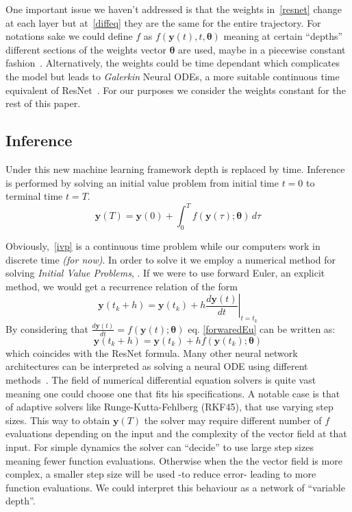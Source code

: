 \documentclass{article}
\begin{document}
    One important issue we haven't addressed is that the weights in~\eqref{resnet} change at each layer but at~\eqref{diffeq} they are the same for the entire trajectory.
    For notations sake we could define $f$ as $f(\pmb{y}(t), t, \pmb{\theta})$ meaning at certain ``depths'' different sections of the weights vector $\pmb{\theta}$ are used, maybe in a piecewise constant fashion~\cite{kidger2022neural}.
    Alternatively, the weights could be time dependant which complicates the model but leads to \textit{Galerkin} Neural ODEs, a more suitable continuous time equivalent of ResNet~\cite{massaroli2020dissecting}.
    For our purposes we consider the weights constant for the rest of this paper.

    \subsection{Inference}
    Under this new machine learning framework depth is replaced by time.
    Inference is performed by solving an initial value problem from initial time $t=0$ to terminal time $t=T$.
    \begin{equation}
        \pmb{y}(T) = \pmb{y}(0) + \int_{0}^{T} f(\pmb{y}(\tau); \pmb{\theta}) \, d\tau \label{ivp}
    \end{equation}

    Obviously,~\eqref{ivp} is a continuous time problem while our computers work in discrete time \textit{(for now)}.
    In order to solve it we employ a numerical method for solving \textit{Initial Value Problems}, .
    If we were to use forward Euler, an explicit method, we would get a recurrence relation of the form
    \begin{equation}
        \pmb{y}(t_k + h) = \pmb{y}(t_k) + h \left. \frac{d\pmb{y}(t)}{dt} \right|_{t = t_k}
        \label{forwaredEu}
    \end{equation}
    By considering that $\frac{d \pmb{y}(t)}{dt} = f(\pmb{y}(t);\pmb{\theta})$ eq. \eqref{forwaredEu} can be written as:
    \begin{equation}
        \pmb{y}(t_k + h) = \pmb{y}(t_k) + h f(\pmb{y}(t_k); \pmb{\theta} )
        \label{res2eul}
    \end{equation}
    which coincides with the ResNet formula.
    Many other neural network architectures can be interpreted as solving a neural ODE using different methods~\cite{chen2019ordinary}.
    The field of numerical differential equation solvers is quite vast meaning one could choose one that fits his specifications.
    A notable case is that of adaptive solvers like Runge-Kutta-Fehlberg (RKF45), that use varying step sizes.
    This way to obtain  $\pmb{y}(T)$ the solver may require different number of $f$ evaluations depending on the input and the complexity of the vector field at that input.
    For simple dynamics the solver can ``decide'' to use large step sizes meaning fewer function evaluations.
    Otherwise when the the vector field is more complex, a smaller step size will be used -to reduce error- leading to more function evaluations.
    We could interpret this behaviour as a network of ``variable depth''.
\end{document}
